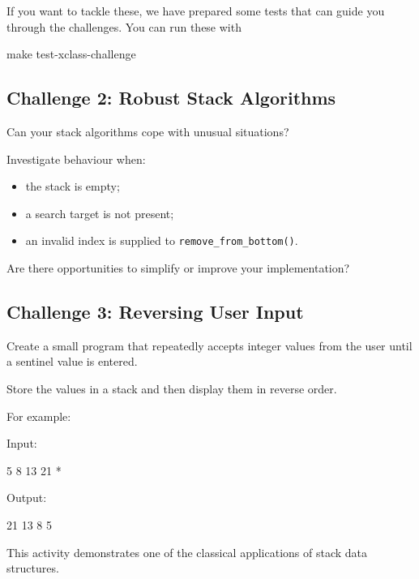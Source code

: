 \documentclass{csc2059practical}
\begin{document}
If you want to tackle these, we have prepared some tests that can guide you through the challenges.  You can run these with

\begin{terminal}
    make test-xclass-challenge
\end{terminal}


\subsection*{Challenge 2: Robust Stack Algorithms}

Can your stack algorithms cope with unusual situations?

Investigate behaviour when:

\begin{itemize}

\item the stack is empty;

\item a search target is not present;

\item an invalid index is supplied to
\texttt{remove\_from\_bottom()}.

\end{itemize}

Are there opportunities to simplify or improve your implementation?

\subsection*{Challenge 3: Reversing User Input}

Create a small program that repeatedly accepts integer values from the
user until a sentinel value is entered.

Store the values in a stack and then display them in reverse order.

For example:

\begin{terminal}
Input:

5
8
13
21
*

Output:

21 13 8 5
\end{terminal}

This activity demonstrates one of the classical applications of stack
data structures.


\end{document}
